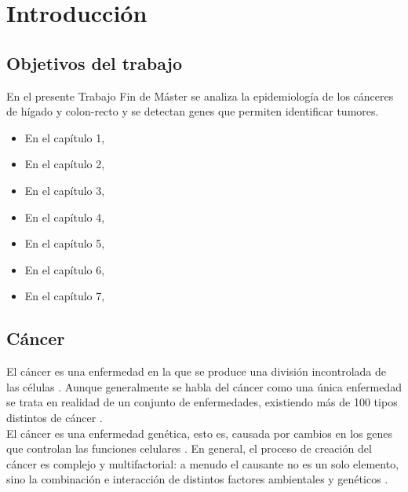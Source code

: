 \chapter{Introducción}

\section{Objetivos del trabajo}

En el presente Trabajo Fin de Máster se analiza la epidemiología de los cánceres de hígado y colon-recto y se detectan genes que permiten identificar tumores.

\begin{itemize}
	\item En el capítulo 1, 
	\item En el capítulo 2,
	\item En el capítulo 3,
	\item En el capítulo 4,
	\item En el capítulo 5,
	\item En el capítulo 6,
	\item En el capítulo 7, 
\end{itemize}


\section{Cáncer}

El cáncer es una enfermedad en la que se produce una división incontrolada de las células \cite{AmericanCancerSociety2015}. Aunque generalmente se habla del cáncer como una única enfermedad se trata en realidad de un conjunto de enfermedades, existiendo más de 100 tipos distintos de cáncer \cite{NationalCancerInstitute2015}.\\

El cáncer es una enfermedad genética, esto es, causada por cambios en los genes que controlan las funciones celulares \cite{NationalCancerInstitute2015}. En general, el proceso de creación del cáncer es complejo y multifactorial: a menudo el causante no es un solo elemento, sino la combinación e interacción de distintos factores ambientales y genéticos \cite{Migliore2012}.\\

